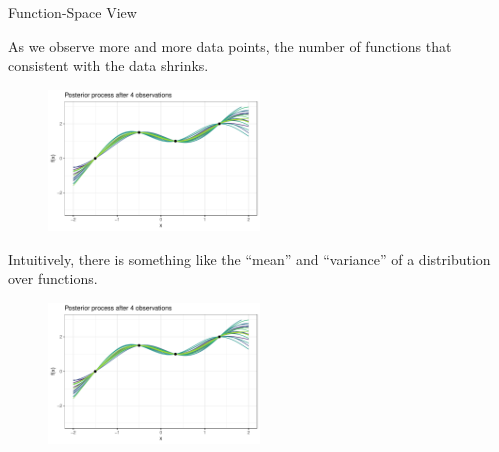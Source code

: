 \begin{frame}[c,allowframebreaks]{Function-Space View}
\framebreak


As we observe more and more data points, the number of functions that consistent with the data shrinks.

  \begin{figure}
    \includegraphics[width=0.5\textwidth]{figure_man/gp-sample/gp-sample-2-4.pdf}
  \end{figure}
  

\framebreak

Intuitively, there is something like the ``mean'' and ``variance'' of a distribution over functions. 

  \begin{figure}
    \includegraphics[width=0.5\textwidth]{figure_man/gp-sample/gp-sample-2-4.pdf}
  \end{figure}

\end{frame}

